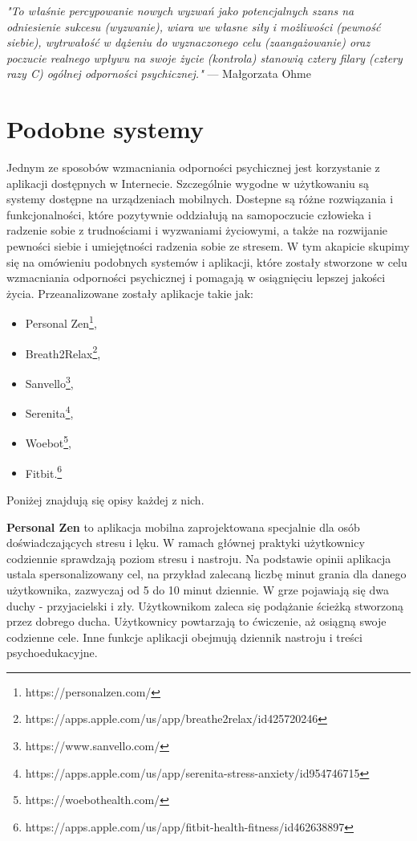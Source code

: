 \begin{center}
    \textit{"To właśnie percypowanie nowych wyzwań jako potencjalnych szans na
        odniesienie sukcesu (wyzwanie), wiara we własne siły i możliwości
        (pewność siebie), wytrwałość w dążeniu do wyznaczonego celu
        (zaangażowanie) oraz poczucie realnego wpływu na swoje życie (kontrola)
        stanowią cztery filary (cztery razy C) ogólnej odporności psychicznej."}
        --- Małgorzata Ohme\cite{coaching}
\end{center}

\section{Podobne systemy}
Jednym ze sposobów wzmacniania odporności psychicznej jest korzystanie z
aplikacji dostępnych w Internecie. Szczególnie wygodne w użytkowaniu są systemy
dostępne na urządzeniach mobilnych. Dostepne są różne rozwiązania i
funkcjonalności, które pozytywnie oddziałują na samopoczucie człowieka i
radzenie sobie z trudnościami i wyzwaniami życiowymi, a także na rozwijanie
pewności siebie i umiejętności radzenia sobie ze stresem. W tym akapicie skupimy
się na omówieniu podobnych systemów i aplikacji, które zostały stworzone w celu
wzmacniania odporności psychicznej i pomagają w osiągnięciu lepszej jakości
życia. Przeanalizowane zostały aplikacje takie jak:

\begin{itemize}
    \item Personal Zen\footnote{https://personalzen.com/},
    \item
          Breath2Relax\footnote{https://apps.apple.com/us/app/breathe2relax/id425720246},
    \item Sanvello\footnote{https://www.sanvello.com/},
    \item
          Serenita\footnote{https://apps.apple.com/us/app/serenita-stress-anxiety/id954746715},
    \item Woebot\footnote{https://woebothealth.com/},
    \item
          Fitbit.\footnote{https://apps.apple.com/us/app/fitbit-health-fitness/id462638897}
\end{itemize}
Poniżej znajdują się opisy każdej z nich.


\textbf{Personal Zen} to aplikacja mobilna zaprojektowana specjalnie dla osób
doświadczających stresu i lęku. W ramach głównej praktyki użytkownicy codziennie
sprawdzają poziom stresu i nastroju. Na podstawie opinii aplikacja ustala
spersonalizowany cel, na przykład zalecaną liczbę minut grania dla danego
użytkownika, zazwyczaj od 5 do 10 minut dziennie. W grze pojawiają się dwa duchy
- przyjacielski i zły. Użytkownikom zaleca się podążanie ścieżką stworzoną przez
dobrego ducha. Użytkownicy powtarzają to ćwiczenie, aż osiągną swoje codzienne
cele. Inne funkcje aplikacji obejmują dziennik nastroju i treści
psychoedukacyjne.

